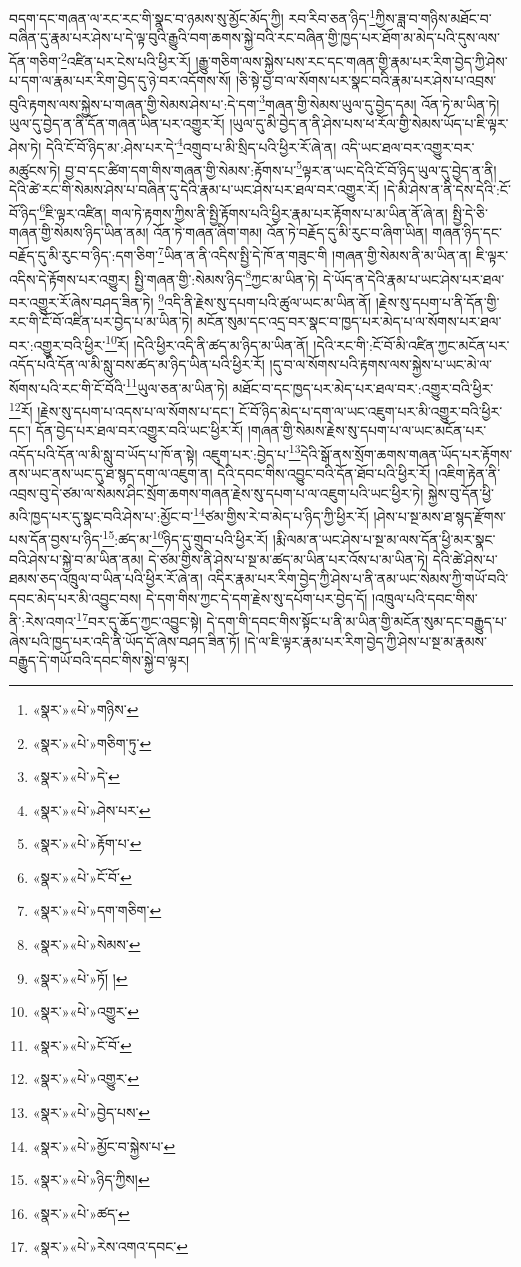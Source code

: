 བདག་དང་གཞན་ལ་རང་རང་གི་སྣང་བ་ཉམས་སུ་མྱོང་མོད་ཀྱི། རབ་རིབ་ཅན་ཉིད་\footnote{«སྣར་»«པེ་»གཉིས་}ཀྱིས་ཟླ་བ་གཉིས་མཐོང་བ་བཞིན་དུ་རྣམ་པར་ཤེས་པ་དེ་ལྟ་བུའི་རྒྱུའི་བག་ཆགས་སྐྱེ་བའི་རང་བཞིན་གྱི་ཁྱད་པར་ཐོག་མ་མེད་པའི་དུས་ལས་དོན་གཅིག་\footnote{«སྣར་»«པེ་»གཅིག་ཏུ་}འཛིན་པར་ངེས་པའི་ཕྱིར་རོ། །རྒྱུ་གཅིག་ལས་སྐྱེས་པས་རང་དང་གཞན་གྱི་རྣམ་པར་རིག་བྱེད་ཀྱི་ཤེས་པ་དག་ལ་རྣམ་པར་རིག་བྱེད་དུ་ཉེ་བར་འདོགས་སོ། །ཅི་སྟེ་བྱ་བ་ལ་སོགས་པར་སྣང་བའི་རྣམ་པར་ཤེས་པ་འབྲས་བུའི་རྟགས་ལས་སྐྱེས་པ་གཞན་གྱི་སེམས་ཤེས་པ་:དེ་དག་\footnote{«སྣར་»«པེ་»དེ་}གཞན་གྱི་སེམས་ཡུལ་དུ་བྱེད་དམ། འོན་ཏེ་མ་ཡིན་ཏེ། ཡུལ་དུ་བྱེད་ན་ནི་དོན་གཞན་ཡིན་པར་འགྱུར་རོ། །ཡུལ་དུ་མི་བྱེད་ན་ནི་ཤེས་པས་ཕ་རོལ་གྱི་སེམས་ཡོད་པ་ཇི་ལྟར་ཤེས་ཏེ། དེའི་ངོ་བོ་ཉིད་མ་:ཤེས་པར་དེ་\footnote{«སྣར་»«པེ་»ཤེས་པར་}འགྲུབ་པ་མི་སྲིད་པའི་ཕྱིར་རོ་ཞེ་ན། འདི་ཡང་ཐལ་བར་འགྱུར་བར་མཚུངས་ཏེ། བྱ་བ་དང་ཚིག་དག་གིས་གཞན་གྱི་སེམས་:རྟོགས་པ་\footnote{«སྣར་»«པེ་»རྟོག་པ་}ལྟར་ན་ཡང་དེའི་ངོ་བོ་ཉིད་ཡུལ་དུ་བྱེད་ན་ནི། དེའི་ཚེ་རང་གི་སེམས་ཤེས་པ་བཞིན་དུ་དེའི་རྣམ་པ་ཡང་ཤེས་པར་ཐལ་བར་འགྱུར་རོ། །དེ་མི་ཤེས་ན་ནི་དེས་དེའི་:ངོ་བོ་ཉིད་\footnote{«སྣར་»«པེ་»ངོ་བོ་}ཇི་ལྟར་འཛིན། གལ་ཏེ་རྟགས་ཀྱིས་ནི་སྤྱི་རྟོགས་པའི་ཕྱིར་རྣམ་པར་རྟོགས་པ་མ་ཡིན་ནོ་ཞེ་ན། སྤྱི་དེ་ཅི་གཞན་གྱི་སེམས་ཉིད་ཡིན་ནམ། འོན་ཏེ་གཞན་ཞིག་གམ། འོན་ཏེ་བརྗོད་དུ་མི་རུང་བ་ཞིག་ཡིན། གཞན་ཉིད་དང་བརྗོད་དུ་མི་རུང་བ་ཉིད་:དག་ཅིག་\footnote{«སྣར་»«པེ་»དག་གཅིག་}ཡིན་ན་ནི་འདིས་སྤྱི་དེ་ཁོ་ན་གཟུང་གི །གཞན་གྱི་སེམས་ནི་མ་ཡིན་ན། ཇི་ལྟར་འདིས་དེ་རྟོགས་པར་འགྱུར། སྤྱི་གཞན་གྱི་:སེམས་ཉིད་\footnote{«སྣར་»«པེ་»སེམས་}ཀྱང་མ་ཡིན་ཏེ། དེ་ཡོད་ན་དེའི་རྣམ་པ་ཡང་ཤེས་པར་ཐལ་བར་འགྱུར་རོ་ཞེས་བཤད་ཟིན་ཏེ། \footnote{«སྣར་»«པེ་»ཏོ། ། }འདི་ནི་རྗེས་སུ་དཔག་པའི་ཚུལ་ཡང་མ་ཡིན་ནོ། །རྗེས་སུ་དཔག་པ་ནི་དོན་གྱི་རང་གི་ངོ་བོ་འཛིན་པར་བྱེད་པ་མ་ཡིན་ཏེ། མངོན་སུམ་དང་འདྲ་བར་སྣང་བ་ཁྱད་པར་མེད་པ་ལ་སོགས་པར་ཐལ་བར་:འགྱུར་བའི་ཕྱིར་\footnote{«སྣར་»«པེ་»འགྱུར་}རོ། །དེའི་ཕྱིར་འདི་ནི་ཚད་མ་ཉིད་མ་ཡིན་ནོ། །དེའི་རང་གི་:ངོ་བོ་མི་འཛིན་ཀྱང་མངོན་པར་འདོད་པའི་དོན་ལ་མི་སླུ་བས་ཚད་མ་ཉིད་ཡིན་པའི་ཕྱིར་རོ། །དུ་བ་ལ་སོགས་པའི་རྟགས་ལས་སྐྱེས་པ་ཡང་མེ་ལ་སོགས་པའི་རང་གི་ངོ་བོའི་\footnote{«སྣར་»«པེ་»ངོ་བོ་}ཡུལ་ཅན་མ་ཡིན་ཏེ། མཐོང་བ་དང་ཁྱད་པར་མེད་པར་ཐལ་བར་:འགྱུར་བའི་ཕྱིར་\footnote{«སྣར་»«པེ་»འགྱུར་}རོ། །རྗེས་སུ་དཔག་པ་འདས་པ་ལ་སོགས་པ་དང་། ངོ་བོ་ཉིད་མེད་པ་དག་ལ་ཡང་འཇུག་པར་མི་འགྱུར་བའི་ཕྱིར་དང་། དོན་བྱེད་པར་ཐལ་བར་འགྱུར་བའི་ཡང་ཕྱིར་རོ། །གཞན་གྱི་སེམས་རྗེས་སུ་དཔག་པ་ལ་ཡང་མངོན་པར་འདོད་པའི་དོན་ལ་མི་སླུ་བ་ཡོད་པ་ཁོ་ན་སྟེ། འཇུག་པར་:བྱེད་པ་\footnote{«སྣར་»«པེ་»བྱེད་པས་}དེའི་སྒོ་ནས་སྲོག་ཆགས་གཞན་ཡོད་པར་རྟོགས་ནས་ཡང་ནས་ཡང་དུ་ཐ་སྙད་དག་ལ་འཇུག་ན། དེའི་དབང་གིས་འབྱུང་བའི་དོན་ཐོབ་པའི་ཕྱིར་རོ། །འཇིག་རྟེན་ནི་འབྲས་བུ་དེ་ཙམ་ལ་སེམས་ཤིང་སྲོག་ཆགས་གཞན་རྗེས་སུ་དཔག་པ་ལ་འཇུག་པའི་ཡང་ཕྱིར་ཏེ། སྐྱེས་བུ་དོན་ཕྱི་མའི་ཁྱད་པར་དུ་སྣང་བའི་ཤེས་པ་:མྱོང་བ་\footnote{«སྣར་»«པེ་»མྱོང་བ་སྐྱེས་པ་}ཙམ་གྱིས་རེ་བ་མེད་པ་ཉིད་ཀྱི་ཕྱིར་རོ། །ཤེས་པ་སྔ་མས་ཐ་སྙད་རྫོགས་པས་དོན་བྱས་པ་ཉིད་\footnote{«སྣར་»«པེ་»ཉིད་ཀྱིས། }:ཚད་མ་\footnote{«སྣར་»«པེ་»ཚད་}ཉིད་དུ་གྲུབ་པའི་ཕྱིར་རོ། །རྨི་ལམ་ན་ཡང་ཤེས་པ་སྔ་མ་ལས་དོན་ཕྱི་མར་སྣང་བའི་ཤེས་པ་སྐྱེ་བ་མ་ཡིན་ནམ། དེ་ཙམ་གྱིས་ནི་ཤེས་པ་སྔ་མ་ཚད་མ་ཡིན་པར་འོས་པ་མ་ཡིན་ཏེ། དེའི་ཚེ་ཤེས་པ་ཐམས་ཅད་འཁྲུལ་བ་ཡིན་པའི་ཕྱིར་རོ་ཞེ་ན། འདིར་རྣམ་པར་རིག་བྱེད་ཀྱི་ཤེས་པ་ནི་ནམ་ཡང་སེམས་ཀྱི་གཡོ་བའི་དབང་མེད་པར་མི་འབྱུང་བས། དེ་དག་གིས་ཀྱང་དེ་དག་རྗེས་སུ་དཔོག་པར་བྱེད་དོ། །འཁྲུལ་པའི་དབང་གིས་ནི་:རེས་འགའ་\footnote{«སྣར་»«པེ་»རེས་འགའ་དབང་}བར་དུ་ཆོད་ཀྱང་འབྱུང་སྟེ། དེ་དག་གི་དབང་གིས་སྟོང་པ་ནི་མ་ཡིན་གྱི་མངོན་སུམ་དང་བརྒྱུད་པ་ཞེས་པའི་ཁྱད་པར་འདི་ནི་ཡོད་དོ་ཞེས་བཤད་ཟིན་ཏོ། །དེ་ལ་ཇི་ལྟར་རྣམ་པར་རིག་བྱེད་ཀྱི་ཤེས་པ་སྔ་མ་རྣམས་བརྒྱུད་དེ་གཡོ་བའི་དབང་གིས་སྐྱེ་བ་ལྟར། 